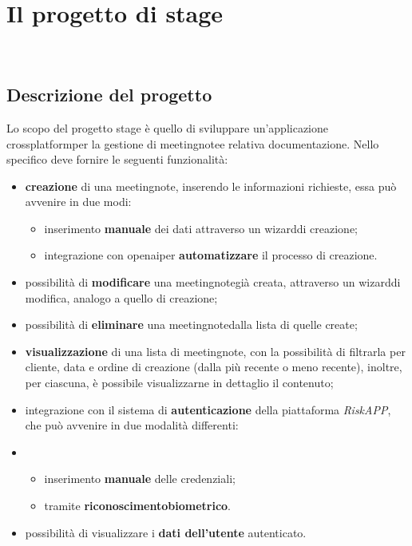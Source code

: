 \chapter{Il progetto di stage}
\label{cap:descrizione-stage}

\\

\section{Descrizione del progetto}
\label{sec:descrizione-progetto}

Lo scopo del progetto stage è quello di sviluppare un'applicazione \gls{crossplatform}\glsoccur per la gestione di \gls{meetingnote}\glsoccur e relativa documentazione.
Nello specifico deve fornire le seguenti funzionalità:
\begin{itemize}
    \item \textbf{creazione} di una \gls{meetingnote}\glsoccur, inserendo le informazioni richieste, essa può avvenire in due modi:
    \begin{itemize}
        \item inserimento \textbf{manuale} dei dati attraverso un \gls{wizard}\glsoccur di creazione;
        \item integrazione con \gls{openai}\glsoccur per \textbf{automatizzare} il processo di creazione.
    \end{itemize}
    \item possibilità di \textbf{modificare} una \gls{meetingnote}\glsoccur già creata, attraverso un \gls{wizard}\glsoccur di modifica, analogo a quello di creazione;
    \item possibilità di \textbf{eliminare} una \gls{meetingnote}\glsoccur dalla lista di quelle create;
    \item \textbf{visualizzazione} di una lista di \gls{meetingnote}\glsoccur, con la possibilità di filtrarla per \gls{cliente}\glsoccur, data e ordine di creazione (dalla più recente o meno recente), inoltre, per ciascuna, è possibile visualizzarne in dettaglio il contenuto;
    \item integrazione con il sistema di \textbf{autenticazione} della piattaforma \emph{RiskAPP}, che può avvenire in due modalità differenti:
    \item \begin{itemize}
        \item inserimento \textbf{manuale} delle credenziali;
        \item tramite \textbf{\gls{riconoscimentobiometrico}}\glsoccur.
    \end{itemize}
    \item possibilità di visualizzare i \textbf{dati dell'utente} autenticato.
\end{itemize}

